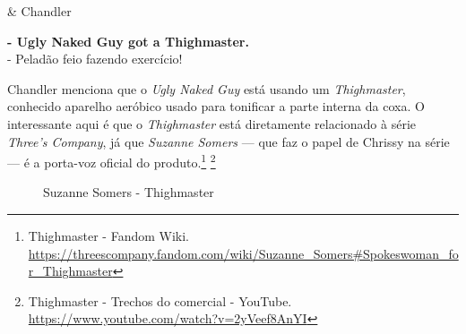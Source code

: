 \begin{tcolorbox}[enhanced,center upper,
    drop fuzzy shadow southeast, boxrule=0.3pt,
    lower separated=false, breakable,
    colframe=black!30!dialogoBorder,colback=white]
\begin{minipage}[c]{0.16\linewidth}
   & \centering \scriptsize{Chandler}
\end{minipage}
\hfill
\begin{minipage}[c]{0.8\linewidth}
  \textbf{- Ugly Naked Guy got a Thighmaster.}\\
  - Peladão feio fazendo exercício!
\end{minipage}
\end{tcolorbox}

\saveparinfos
\noindent
\begin{minipage}[c]{0.5\textwidth}\useparinfo

Chandler menciona que o \emph{Ugly Naked Guy} está usando um
\emph{Thighmaster}, conhecido aparelho aeróbico usado para tonificar a
parte interna da coxa. O interessante aqui é que o \emph{Thighmaster}
está diretamente relacionado à série \emph{Three's Company}, já que
\emph{Suzanne Somers} --- que faz o papel de Chrissy na série --- é a
porta-voz oficial do produto.\footnote{\sloppy Thighmaster - Fandom Wiki. \url{https://threescompany.fandom.com/wiki/Suzanne_Somers#Spokeswoman_for_Thighmaster}}
\footnote{\sloppy Thighmaster - Trechos do comercial - YouTube. \url{https://www.youtube.com/watch?v=2yVeef8AnYI}}

\end{minipage}\hfill
\begin{minipage}[c]{0.45\textwidth}

\begin{figure}
  \centering
    \caption{Suzanne Somers - Thighmaster\label{fig:suzanne-somers-thighmaster}}
\end{figure}

\end{minipage}

